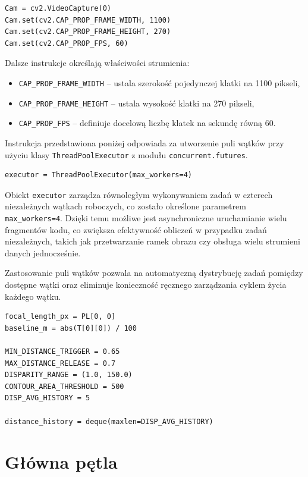 \documentclass[magisterska]{pracadypl}
\begin{document}
\begin{lstlisting}[style=mypython]
Cam = cv2.VideoCapture(0)
Cam.set(cv2.CAP_PROP_FRAME_WIDTH, 1100)  
Cam.set(cv2.CAP_PROP_FRAME_HEIGHT, 270)
Cam.set(cv2.CAP_PROP_FPS, 60)
\end{lstlisting}

Dalsze instrukcje określają właściwości strumienia:  
\begin{itemize}
    \item \texttt{CAP\_PROP\_FRAME\_WIDTH} – ustala szerokość pojedynczej klatki na 1100 pikseli,  
    \item \texttt{CAP\_PROP\_FRAME\_HEIGHT} – ustala wysokość klatki na 270 pikseli,  
    \item \texttt{CAP\_PROP\_FPS} – definiuje docelową liczbę klatek na sekundę równą 60.  
\end{itemize}

Instrukcja przedstawiona poniżej odpowiada za utworzenie puli wątków przy użyciu klasy 
\texttt{ThreadPoolExecutor} z modułu \texttt{concurrent.futures}.  

\begin{lstlisting}[style=mypython]
executor = ThreadPoolExecutor(max_workers=4)
\end{lstlisting}

Obiekt \texttt{executor} zarządza równoległym wykonywaniem zadań w czterech niezależnych 
wątkach roboczych, co zostało określone parametrem \texttt{max\_workers=4}. 
Dzięki temu możliwe jest asynchroniczne uruchamianie wielu fragmentów kodu, 
co zwiększa efektywność obliczeń w przypadku zadań niezależnych, takich jak 
przetwarzanie ramek obrazu czy obsługa wielu strumieni danych jednocześnie.  

Zastosowanie puli wątków pozwala na automatyczną dystrybucję zadań pomiędzy dostępne 
wątki oraz eliminuje konieczność ręcznego zarządzania cyklem życia każdego wątku.


\begin{lstlisting}[style=mypython]
focal_length_px = PL[0, 0]
baseline_m = abs(T[0][0]) / 100  

MIN_DISTANCE_TRIGGER = 0.65
MAX_DISTANCE_RELEASE = 0.7
DISPARITY_RANGE = (1.0, 150.0)
CONTOUR_AREA_THRESHOLD = 500
DISP_AVG_HISTORY = 5

distance_history = deque(maxlen=DISP_AVG_HISTORY)
\end{lstlisting}

\section*{Główna pętla}
\end{document}
